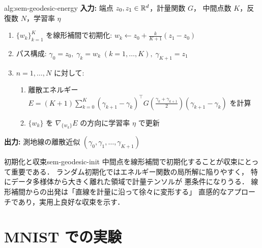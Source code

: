 \begin{algorithm}{alg:sem-geodesic-energy}
\textbf{入力:} 端点 $z_0, z_1 \in \mathbb{R}^d$，計量関数 $G$，
中間点数 $K$，反復数 $N$，学習率 $\eta$

\begin{enumerate}
  \item $\{w_k\}_{k=1}^K$ を線形補間で初期化:
    $w_k \gets z_0 + \frac{k}{K+1}(z_1 - z_0)$
  \item パス構成: $\gamma_0 = z_0,\; \gamma_k = w_k\; (k=1,\ldots,K),\; \gamma_{K+1} = z_1$
  \item $n = 1, \ldots, N$ に対して:
    \begin{enumerate}
      \item 離散エネルギー
        $E = (K+1)\displaystyle\sum_{k=0}^{K}
              (\gamma_{k+1} - \gamma_k)^\top
              G\!\left(\frac{\gamma_k + \gamma_{k+1}}{2}\right)
              (\gamma_{k+1} - \gamma_k)$
        を計算
      \item $\{w_k\}$ を $\nabla_{\{w_k\}} E$ の方向に学習率 $\eta$ で更新
    \end{enumerate}
\end{enumerate}

\textbf{出力:} 測地線の離散近似 $(\gamma_0, \gamma_1, \ldots, \gamma_{K+1})$
\end{algorithm}

\begin{remark}{初期化と収束}{sem-geodesic-init}
  中間点を線形補間で初期化することが収束にとって重要である．
  ランダム初期化ではエネルギー関数の局所解に陥りやすく，
  特にデータ多様体から大きく離れた領域で計量テンソルが
  悪条件になりうる．
  線形補間からの出発は「直線を計量に沿って徐々に変形する」
  直感的なアプローチであり，実用上良好な収束を示す．
\end{remark}

\section{MNIST での実験}
\label{sec:sem-mnist-experiment}

